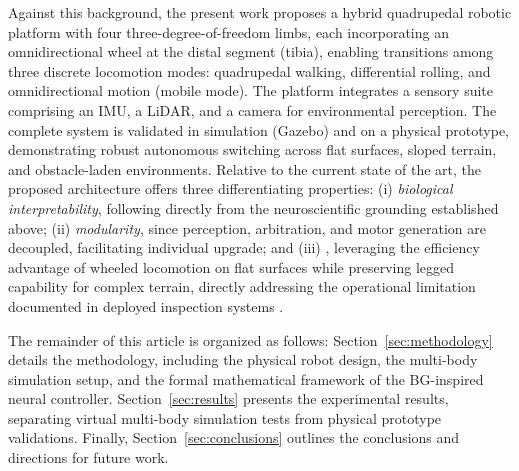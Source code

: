 Against this background, the present work proposes a hybrid quadrupedal robotic platform with four three-degree-of-freedom limbs, each incorporating an omnidirectional wheel at the distal segment (tibia), enabling transitions among three discrete locomotion modes: quadrupedal walking, differential rolling, and omnidirectional motion (mobile mode). The platform integrates a sensory suite comprising an IMU, a LiDAR, and a camera for environmental perception.  The complete system is validated in simulation (Gazebo) and on a physical prototype, demonstrating robust autonomous switching across flat surfaces, sloped terrain, and obstacle-laden environments. Relative to the current state of the art, the proposed architecture offers three differentiating properties: (i) \emph{biological interpretability}, following directly from the neuroscientific grounding established above; (ii) \emph{modularity}, since perception, arbitration, and motor generation are decoupled, facilitating individual upgrade; and (iii) , leveraging the efficiency advantage of wheeled locomotion on flat surfaces while preserving legged capability for complex terrain, directly addressing the operational limitation documented in deployed inspection systems \citep{Hutter2017ANYmal,Tranzatto2022CERBERUS}.

The remainder of this article is organized as follows: Section~\ref{sec:methodology} details the methodology, including the physical robot design, the multi-body simulation setup, and the formal mathematical framework of the BG-inspired neural controller. Section~\ref{sec:results} presents the experimental results, separating virtual multi-body simulation tests from physical prototype validations. Finally, Section~\ref{sec:conclusions} outlines the conclusions and directions for future work.

